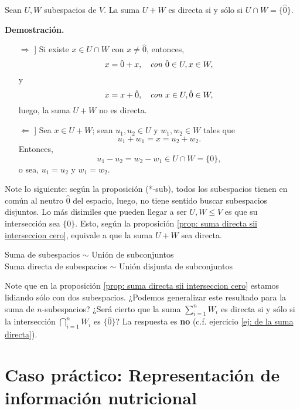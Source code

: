 \begin{prop}
	\label{prop: suma directa sii interseccion cero}
Sean $U, W$ subespacios de $V$. La suma
$U+ W$ es directa si y sólo si $U \cap W = \{ \hat{0} \}$.
\end{prop}
\noindent
\textbf{Demostración.}
\begin{itemize}
	\item[$\Rightarrow$]] Si existe $x \in U \cap W$
	con $x \neq \hat{0}$, entonces, 
	\[
	x = \hat{0} + x, \hspace{0.2cm} \textit{ con }
	\hat{0} \in U, x \in W,
	\]
	y 
	\[
	x = x + \hat{0}, \hspace{0.2cm} \textit{ con }
	x \in U, \hat{0} \in W,
	\]
	luego, la suma $U + W$ no es directa.
	
	\item[$\Leftarrow$]] Sea $x \in U + W$; sean
	$u_{1}, u_{2} \in U$ y $w_{1}, w_{2} \in W$ tales que
	\[
	u_{1} + w_{1} = x = u_{2} + w_{2}.
	\]
	Entonces, 
	\[
	u_{1} - u_{2} = w_{2} - w_{1} \in U \cap W = \{ 0 \},
	\]
	o sea, $u_{1} = u_{2}$ y $w_{1} = w_{2}$.
	
	
\end{itemize}

\QEDB
\vspace{0.2cm}

Note lo siguiente: según la proposición 
(*-sub), todos los subespacios tienen en común al 
neutro $\hat{0}$ del espacio, luego, no tiene sentido
buscar subespacios disjuntos. Lo más disimiles que pueden
llegar a ser $U, W \leq V$ es que su intersección sea
$\{ 0 \}$. Esto, según la proposición 
\ref{prop: suma directa sii interseccion cero}, 
equivale a que la suma $U + W$ sea directa.


\begin{center}
Suma de subespacios $\sim$ Unión de subconjuntos \\
Suma directa de subespacios 
$\sim$ Unión disjunta de subconjuntos
\end{center}

Note que en la proposición \ref{prop: suma directa sii interseccion cero}
estamos lidiando sólo con dos subespacios. ¿Podemos generalizar
este resultado para la suma de $n$-subespacios? ¿Será cierto que
la suma $\sum_{i=1}^{n} W_{i}$ es directa si y sólo si 
la intersección $\bigcap_{i = 1}^{n} W_{i}$ es $\{ \hat{0} \}$?
La respuesta es \textbf{no} (c.f. ejercicio
\ref{ej: de la suma directa}).


\section{Caso práctico: Representación de información nutricional}

